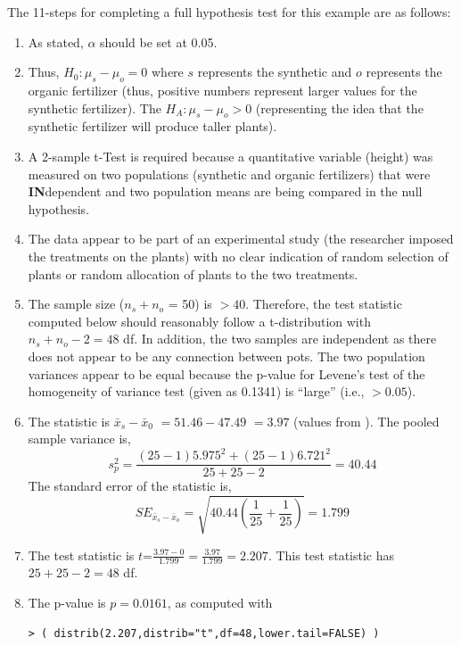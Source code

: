 \documentclass[10pt,openany]{book}\usepackage[]{graphicx}\usepackage[]{color}
\makeatletter
\newenvironment{kframe}{%
 \def\at@end@of@kframe{}%
 \ifinner\ifhmode%
  \def\at@end@of@kframe{\end{minipage}}%
  \begin{minipage}{\columnwidth}%
 \fi\fi%
 \def\FrameCommand##1{\hskip\@totalleftmargin \hskip-\fboxsep
 \colorbox{shadecolor}{##1}\hskip-\fboxsep
     \hskip-\linewidth \hskip-\@totalleftmargin \hskip\columnwidth}%
 \MakeFramed {\advance\hsize-\width
   \@totalleftmargin\z@ \linewidth\hsize
   \@setminipage}}%
 {\par\unskip\endMakeFramed%
 \at@end@of@kframe}
\newenvironment{knitrout}{}{} %
\makeatother
\begin{document}
The 11-steps  for completing a full hypothesis test for this example are as follows:
  \begin{enumerate}
    \item As stated, $\alpha$ should be set at 0.05.
    \item Thus, $H_{0}:\mu_{s}-\mu_{o}=0$ where $s$ represents the synthetic and $o$ represents the organic fertilizer (thus, positive numbers represent larger values for the synthetic fertilizer).  The $H_{A}:\mu_{s}-\mu_{o}>0$ (representing the idea that the synthetic fertilizer will produce taller plants).
    \item A 2-sample t-Test is required because a quantitative variable (height) was measured on two populations (synthetic and organic fertilizers) that were \textbf{IN}dependent and two population means are being compared in the null hypothesis.
    \item The data appear to be part of an experimental study (the researcher imposed the treatments on the plants) with no clear indication of random selection of plants or random allocation of plants to the two treatments.
    \item The sample size ($n_{s}+n_{o}$ = 50) is $>40$.  Therefore, the test statistic computed below should reasonably follow a t-distribution with $n_{s}+n_{o}-2=48$ df.  In addition, the two samples are independent as there does not appear to be any connection between pots.  The two population variances appear to be equal because the p-value for Levene's test of the homogeneity of variance test (given as 0.1341) is ``large'' (i.e., $>0.05$).
    \item The statistic is $\bar{x}_{s}-\bar{x}_{0}$ $= 51.46-47.49$ $= 3.97$ (values from ).  The pooled sample variance is,
    \[s_{p}^{2}=\frac{(25-1)5.975^{2}+(25-1)6.721^{2}}{25+25-2} = 40.44 \]
The standard error of the statistic is,
    \[ SE_{\bar{x}_{s}-\bar{x}_{o}}=\sqrt{40.44\left(\frac{1}{25}+\frac{1}{25} \right)} = 1.799  \]
    \item The test statistic is $t$=$\frac{3.97-0}{1.799} = \frac{3.97}{1.799} = 2.207$.  This test statistic has $25+25-2=48$ df.
    \item The p-value is $p=0.0161$, as computed with
\begin{knitrout}
\color{fgcolor}\begin{kframe}
\begin{verbatim}
> ( distrib(2.207,distrib="t",df=48,lower.tail=FALSE) )

\end{verbatim}
\end{kframe}
\end{knitrout}
\end{enumerate}
\end{document}
